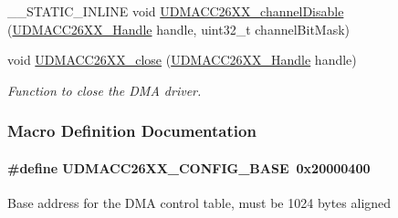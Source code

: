 \begin{DoxyCompactItemize}
\item 
\+\_\+\+\_\+\+S\+T\+A\+T\+I\+C\+\_\+\+I\+N\+L\+I\+N\+E void \hyperlink{_u_d_m_a_c_c26_x_x_8h_a0cd214fa0e13f1ddb1a519a30acfe30c}{U\+D\+M\+A\+C\+C26\+X\+X\+\_\+channel\+Disable} (\hyperlink{_u_d_m_a_c_c26_x_x_8h_a969a9feb0f822c4764ef1da2ff5066cf}{U\+D\+M\+A\+C\+C26\+X\+X\+\_\+\+Handle} handle, uint32\+\_\+t channel\+Bit\+Mask)
\item 
void \hyperlink{_u_d_m_a_c_c26_x_x_8h_a5529a47329f27d70c490c5ed1c1b19f0}{U\+D\+M\+A\+C\+C26\+X\+X\+\_\+close} (\hyperlink{_u_d_m_a_c_c26_x_x_8h_a969a9feb0f822c4764ef1da2ff5066cf}{U\+D\+M\+A\+C\+C26\+X\+X\+\_\+\+Handle} handle)
\begin{DoxyCompactList}\small\item\em Function to close the D\+M\+A driver. \end{DoxyCompactList}\end{DoxyCompactItemize}


\subsubsection{Macro Definition Documentation}
\paragraph[{U\+D\+M\+A\+C\+C26\+X\+X\+\_\+\+C\+O\+N\+F\+I\+G\+\_\+\+B\+A\+S\+E}]{\setlength{\rightskip}{0pt plus 5cm}\#define U\+D\+M\+A\+C\+C26\+X\+X\+\_\+\+C\+O\+N\+F\+I\+G\+\_\+\+B\+A\+S\+E~0x20000400}\label{_u_d_m_a_c_c26_x_x_8h_ab956c64f89045e5c6546115ec6062a7f}
Base address for the D\+M\+A control table, must be 1024 bytes aligned 
